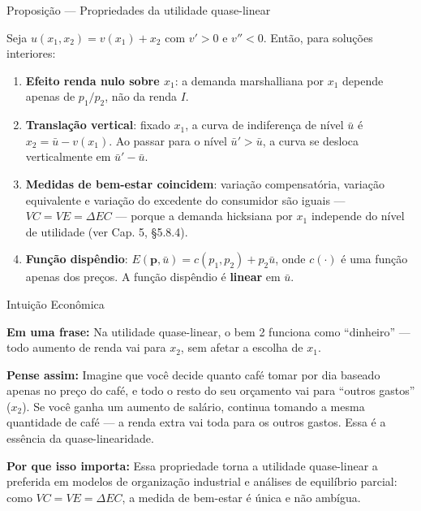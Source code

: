 \documentclass[11pt,twoside,openright]{book}
\providecommand{\tightlist}{\setlength{\itemsep}{0pt}\setlength{\parskip}{0pt}}
\begin{document}
\begin{theorembox}{Proposição — Propriedades da utilidade quase-linear}

Seja \(u(x_1, x_2) = v(x_1) + x_2\) com \(v' > 0\) e \(v'' < 0\). Então,
para soluções interiores:

\begin{enumerate}
\def\labelenumi{\arabic{enumi}.}
\tightlist
\item
  \textbf{Efeito renda nulo sobre \(x_1\)}: a demanda marshalliana por
  \(x_1\) depende apenas de \(p_1/p_2\), não da renda \(I\).
\item
  \textbf{Translação vertical}: fixado \(x_1\), a curva de indiferença
  de nível \(\bar{u}\) é \(x_2 = \bar{u} - v(x_1)\). Ao passar para o
  nível \(\bar{u}' > \bar{u}\), a curva se desloca verticalmente em
  \(\bar{u}' - \bar{u}\).
\item
  \textbf{Medidas de bem-estar coincidem}: variação compensatória,
  variação equivalente e variação do excedente do consumidor são iguais
  --- \(VC = VE = \Delta EC\) --- porque a demanda hicksiana por \(x_1\)
  independe do nível de utilidade (ver Cap. 5, §5.8.4).
\item
  \textbf{Função dispêndio}:
  \(E(\mathbf{p}, \bar{u}) = c(p_1, p_2) + p_2 \bar{u}\), onde
  \(c(\cdot)\) é uma função apenas dos preços. A função dispêndio é
  \textbf{linear} em \(\bar{u}\).
\end{enumerate}

\end{theorembox}

\begin{intuitionbox}{Intuição Econômica}

\textbf{Em uma frase:} Na utilidade quase-linear, o bem 2 funciona como
``dinheiro'' --- todo aumento de renda vai para \(x_2\), sem afetar a
escolha de \(x_1\).

\textbf{Pense assim:} Imagine que você decide quanto café tomar por dia
baseado apenas no preço do café, e todo o resto do seu orçamento vai
para ``outros gastos'' (\(x_2\)). Se você ganha um aumento de salário,
continua tomando a mesma quantidade de café --- a renda extra vai toda
para os outros gastos. Essa é a essência da quase-linearidade.

\textbf{Por que isso importa:} Essa propriedade torna a utilidade
quase-linear a preferida em modelos de organização industrial e análises
de equilíbrio parcial: como \(VC = VE = \Delta EC\), a medida de
bem-estar é única e não ambígua.

\end{intuitionbox}
\end{document}
